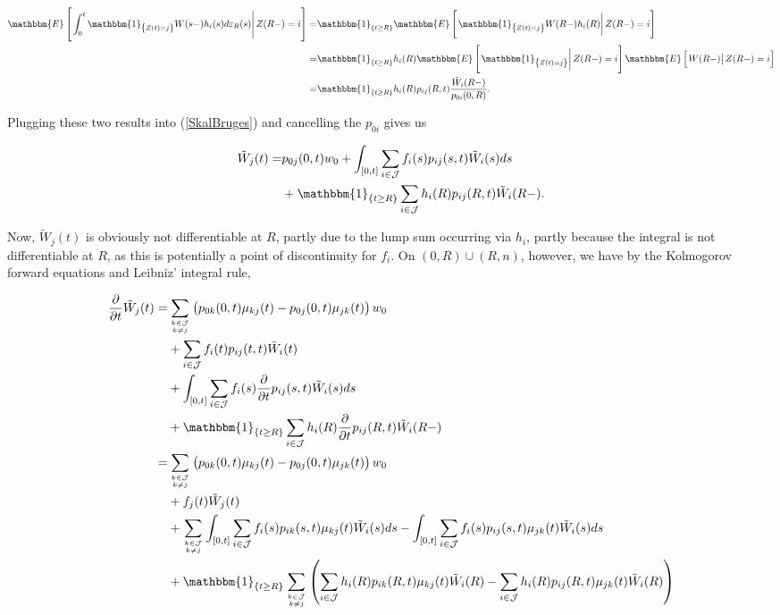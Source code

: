 \documentclass{book}
\newcommand{\1}[1]{\mathbbm{1}_{\left\lbrace #1 \right\rbrace}}
\newcommand{\econd}[2][def]{\mathbbm{E} \left[ \left. #1 \right| #2 \right]}
\theoremstyle{break}
\theoremstyle{remark}
\numberwithin{equation}{section}
\begin{document}
\begin{align*}
	\econd[\int_0^t \1{Z(t)=j} W(s-) h_{i}(s) d \varepsilon_{R}(s)]{Z(R-)=i} =& \1{t \geq R} \econd[\1{Z(t)=j} W(R-) h_{i}(R)]{Z(R-)=i} \\
	=& \1{t \geq R} h_{i}(R) \econd[\1{Z(t)=j}]{Z(R-)=i} \econd[W(R-)]{Z(R-)=i} \\
	=& \1{t \geq R} h_{i}(R) p_{ij}(R,t) \frac{\tilde{W}_i(R-)}{p_{0i}(0,R)}.
\end{align*}

Plugging these two results into (\ref{SkalBruges}) and cancelling the $p_{0i}$ gives us

\begin{align} \label{Brug}
\begin{split}
		\tilde{W}_j(t) =& p_{0j}(0,t) w_0 + \int_{\left[ 0,t \right]} \sum_{i \in \mathcal{J}} f_{i}(s) p_{ij}(s,t) \tilde{W}_i(s) ds \\
	&+ \1{t \geq R} \sum_{i \in \mathcal{J}} h_{i}(R) p_{ij}(R,t) \tilde{W}_i(R-).
\end{split}
\end{align}

Now, $\tilde{W}_j(t)$ is obviously not differentiable at $R$, partly due to the lump sum occurring via $h_i$, partly because the integral is not differentiable at $R$, as this is potentially a point of discontinuity for $f_i$. On $(0,R)\cup(R,n)$, however, we have by the Kolmogorov forward equations and Leibniz' integral rule,

\begin{align*}
	\frac{\partial}{\partial t} \tilde{W}_j(t) =&\sum_{k \in \mathcal{J} \atop k \neq j} \left(p_{0k}(0,t) \mu_{kj}(t) - p_{0j}(0,t) \mu_{jk}(t) \right) w_0 \\
	&+ \sum_{i \in \mathcal{J}} f_i(t) p_{ij}(t,t) \tilde{W}_i(t) \\
	&+ \int_{\left[ 0,t \right]} \sum_{i \in \mathcal{J}} f_{i}(s) \frac{\partial}{\partial t} p_{ij}(s,t) \tilde{W}_i(s) ds \\
	&+ \1{t \geq R} \sum_{i \in \mathcal{J}} h_{i}(R) \frac{\partial}{\partial t} p_{ij}(R,t) \tilde{W}_i(R-) \\
	=& \sum_{k \in \mathcal{J} \atop k \neq j} \left(p_{0k}(0,t) \mu_{kj}(t) - p_{0j}(0,t) \mu_{jk}(t) \right) w_0 \\
	&+ f_j(t) \tilde{W}_j(t) \\
	&+ \sum_{k \in \mathcal{J} \atop k \neq j} \int_{\left[ 0,t \right]} \sum_{i \in \mathcal{J}} f_{i}(s) p_{ik}(s,t) \mu_{kj}(t) \tilde{W}_i(s) ds - \int_{\left[ 0,t \right]} \sum_{i \in \mathcal{J}} f_{i}(s) p_{ij}(s,t) \mu_{jk}(t) \tilde{W}_i(s) ds \\
	&+ \1{t \geq R} \sum_{k \in \mathcal{J} \atop k \neq j} \left( \sum_{i \in \mathcal{J}} h_{i}(R) p_{ik}(R,t) \mu_{kj}(t) \tilde{W}_i(R) - \sum_{i \in \mathcal{J}} h_{i}(R) p_{ij}(R,t) \mu_{jk}(t) \tilde{W}_i(R) \right) \\
\end{align*}
\end{document}
